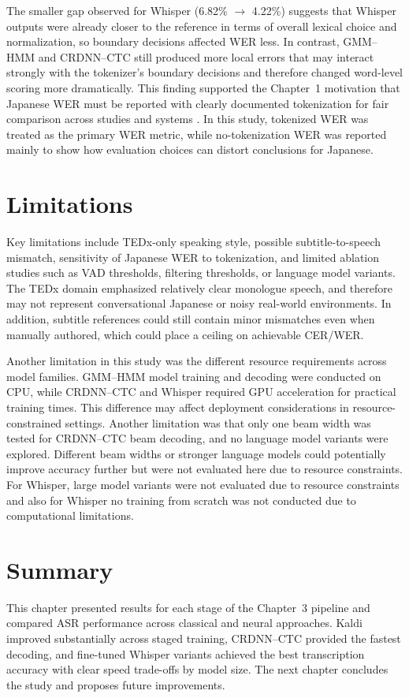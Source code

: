 The smaller gap observed for Whisper (6.82\% $\rightarrow$ 4.22\%) suggests that Whisper outputs were already closer to the reference in terms of overall lexical choice and normalization, so boundary decisions affected WER less. 
In contrast, GMM--HMM and CRDNN--CTC still produced more local errors that may interact strongly with the tokenizer’s boundary decisions and therefore changed word-level scoring more dramatically. This finding supported the Chapter~1 motivation that {Japanese WER must be reported with clearly documented tokenization} for fair comparison across studies and systems \parencite{ando2021}. In this study, {tokenized WER was treated as the primary WER metric}, while no-tokenization WER was reported mainly to show how evaluation choices can distort conclusions for Japanese.

\section{Limitations}
Key limitations include TEDx-only speaking style, possible subtitle-to-speech mismatch, sensitivity of Japanese WER to tokenization, and limited ablation studies such as VAD thresholds, filtering thresholds, or language model variants. The TEDx domain emphasized relatively clear monologue speech, and therefore may not represent conversational Japanese or noisy real-world environments. In addition, subtitle references could still contain minor mismatches even when manually authored, which could place a ceiling on achievable CER/WER. 

Another limitation in this study was the different resource requirements across model families. GMM--HMM model training and decoding were conducted on CPU, while CRDNN--CTC and Whisper required GPU acceleration for practical training times. This difference may affect deployment considerations in resource-constrained settings. Another limitation was that only one beam width was tested for CRDNN--CTC beam decoding, and no language model variants were explored. Different beam widths or stronger language models could potentially improve accuracy further but were not evaluated here due to resource constraints. For Whisper, large model variants were not evaluated due to resource constraints and also for Whisper no training from scratch was not conducted due to computational limitations.


\section{Summary}
This chapter presented results for each stage of the Chapter~3 pipeline and compared ASR performance across classical and neural approaches. Kaldi improved substantially across staged training, CRDNN--CTC provided the fastest decoding, and fine-tuned Whisper variants achieved the best transcription accuracy with clear speed trade-offs by model size. The next chapter concludes the study and proposes future improvements.
